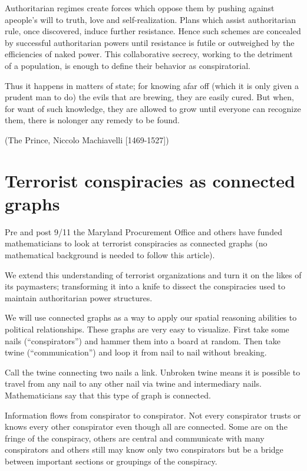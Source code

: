 \documentclass[letterpaper,12pt,english]{sphinxmanual}
\begin{document}
Authoritarian regimes create forces which oppose them by pushing against apeople’s will to truth, love and self-realization. Plans which assist authoritarian rule, once discovered, induce further resistance. Hence such schemes are concealed by successful authoritarian powers until resistance is futile or outweighed by the efficiencies of naked power. This collaborative secrecy, working to the detriment of a population, is enough to define their behavior as conspiratorial.

Thus it happens in matters of state; for knowing afar off (which it is only given a prudent man to do) the evils that are brewing, they are easily cured. But when, for want of such knowledge, they are allowed to grow until everyone can recognize them, there is nolonger any remedy to be found.

(The Prince, Niccolo Machiavelli {[}1469-1527{]})


\section{Terrorist conspiracies as connected graphs}
\label{assange:terrorist-conspiracies-as-connected-graphs}
Pre and post 9/11 the Maryland Procurement Office and others have funded
mathematicians to look at terrorist conspiracies as connected graphs (no mathematical background is needed to follow this article).

We extend this understanding of terrorist organizations and turn it on the likes of its paymasters; transforming it into a knife to dissect the conspiracies used to maintain authoritarian power structures.

We will use connected graphs as a way to apply our spatial reasoning abilities to political relationships. These graphs are very easy to visualize. First take some nails (“conspirators”) and hammer them into a board at random. Then take twine (“communication”) and loop it from nail to nail without breaking.

Call the twine connecting two nails a link. Unbroken twine means it is possible to travel from any nail to any other nail via twine and intermediary nails. Mathematicians say that this type of graph is connected.

Information flows from conspirator to conspirator. Not every conspirator trusts or knows every other conspirator even though all are connected. Some are on the fringe of the conspiracy, others are central and communicate with many conspirators and others still may know only two conspirators but be a bridge between important sections or groupings of the conspiracy.
\end{document}
